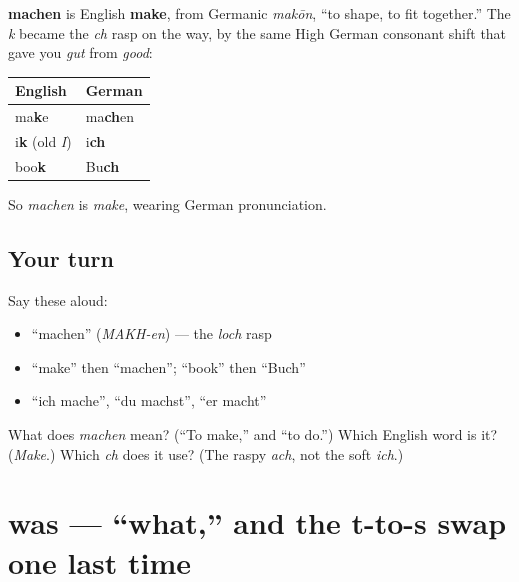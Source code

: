 \begin{cousinweb}
\textbf{machen} is English \textbf{make}, from Germanic \emph{makōn}, \textquotedblleft{}to shape, to fit together.\textquotedblright{} The \emph{k} became the \emph{ch} rasp on the way, by the same High German consonant shift that gave you \emph{gut} from \emph{good}:

\noindent
\begin{tabularx}{\linewidth}{@{}>{\raggedright\arraybackslash}X>{\raggedright\arraybackslash}X@{}}
\toprule
\textbf{English} & \textbf{German} \\
\midrule
ma\textbf{k}e & ma\textbf{ch}en \\
i\textbf{k} (old \emph{I}) & i\textbf{ch} \\
boo\textbf{k} & Bu\textbf{ch} \\
\bottomrule
\end{tabularx}

So \emph{machen} is \emph{make}, wearing German pronunciation.
\end{cousinweb}

\subsection*{Your turn}
Say these aloud:

\begin{itemize}
\raggedright
  \item \textquotedblleft{}machen\textquotedblright{} (\emph{MAKH-en}) — the \emph{loch} rasp
  \item \textquotedblleft{}make\textquotedblright{} then \textquotedblleft{}machen\textquotedblright{}; \textquotedblleft{}book\textquotedblright{} then \textquotedblleft{}Buch\textquotedblright{}
  \item \textquotedblleft{}ich mache\textquotedblright{}, \textquotedblleft{}du machst\textquotedblright{}, \textquotedblleft{}er macht\textquotedblright{}
\end{itemize}

\begin{tcolorbox}[breakable,colback=teal!4,colframe=teal!35!black,title={Before you move on}]
What does \emph{machen} mean? (\textquotedblleft{}To make,\textquotedblright{} and \textquotedblleft{}to do.\textquotedblright{}) Which English word is it? (\emph{Make}.) Which \emph{ch} does it use? (The raspy \emph{ach}, not the soft \emph{ich}.)
\end{tcolorbox}
\section[was]{was — \textquotedblleft{}what,\textquotedblright{} and the t-to-s swap one last time}

